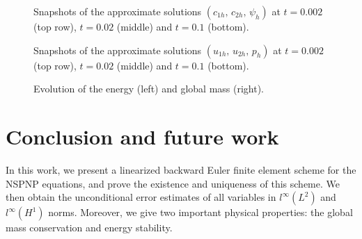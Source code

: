 
\begin{figure}[htbp]
  \centering
  \caption{Snapshots of the approximate solutions $(c_{1h},\,c_{2h},\,\psi_{h})$ at
           $t = 0.002$ (top row), $t = 0.02$ (middle) and $t = 0.1$ (bottom).}
  \label{fig:c1c2psi}
\end{figure}

\begin{figure}[htbp]
  \centering
  \caption{Snapshots of the approximate solutions $(u_{1h},\,u_{2h},\,p_{h})$ at
           $t = 0.002$ (top row), $t = 0.02$ (middle) and $t = 0.1$ (bottom).}
  \label{fig:u1u2p}
\end{figure}

\begin{figure}[htbp]
  \centering
  \caption{Evolution of the energy (left) and global mass (right).}
  \label{fig:energy-mass}
\end{figure}

\section{Conclusion and future work}
\label{sec:conclusion}

In this work, we present a linearized backward Euler finite element scheme for the NSPNP
equations, and prove the existence and uniqueness of this scheme. We then obtain the
unconditional error estimates of all variables in $l^{\infty}(L^{2})$ and
$l^{\infty}(H^{1})$ norms. Moreover, we give two important physical properties: the global
mass conservation and energy stability.

